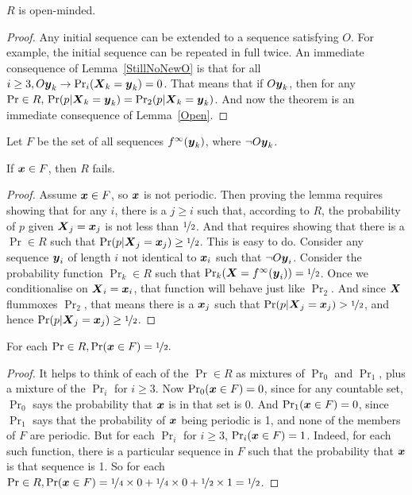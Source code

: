 \begin{theorem}
\label{ROpen}
$R$ is open-minded.
\end{theorem}
\begin{proof}
Any initial sequence can be extended to a sequence satisfying $O$. For example, the initial sequence can be repeated in full twice. An immediate consequence of Lemma~\ref{StillNoNewO} is that for all $i \geq 3,  O\boldsymbol{y}_k \rightarrow \Pr_i(\boldsymbol{X}_k = \boldsymbol{y}_k) = 0$. That means that if $O\boldsymbol{y}_k$, then for any $\Pr \in R,{ } \Pr(p | \boldsymbol{X}_k = \boldsymbol{y}_k) = \Pr_2(p | \boldsymbol{X}_k = \boldsymbol{y}_k)$. And now the theorem is an immediate consequence of Lemma~\ref{Open}.
\end{proof}

Let $F$ be the set of all sequences $f^\infty(\boldsymbol{y}_k)$, where $\neg O \boldsymbol{y}_k$.

\begin{lemma}
\label{FFail}
If $\boldsymbol{x} \in F$, then $R$ fails.
\end{lemma}
\begin{proof}
Assume $\boldsymbol{x} \in F$, so $\boldsymbol{x}$ is not periodic. Then proving the lemma requires showing that for any $i$, there is a $j \geq i$ such that, according to $R$, the probability of $p$ given $\boldsymbol{X}_j =\boldsymbol{x}_j$ is not less than $\nicefrac{1}{2}$. And that requires showing that there is a $\Pr \in R$ such that $\Pr(p | \boldsymbol{X}_j = \boldsymbol{x}_j) \geq \nicefrac{1}{2}$. This is easy to do. Consider any sequence $\boldsymbol{y}_i$ of length $i$ not identical to $\boldsymbol{x}_i$ such that $\neg O \boldsymbol{y}_i$. Consider the probability function $\Pr_k \in R$ such that $\Pr_k(\boldsymbol{X} = f^\infty(\boldsymbol{y}_i)) = \nicefrac{1}{2}$. Once we conditionalise on $\boldsymbol{X}_i = \boldsymbol{x}_i$, that function will behave just like $\Pr_2$. And since $\boldsymbol{X}$ flummoxes $\Pr_2$, that means there is a $\boldsymbol{x}_j$ such that  $\Pr(p | \boldsymbol{X}_j = \boldsymbol{x}_j) > \nicefrac{1}{2}$, and hence $\Pr(p | \boldsymbol{X}_j = \boldsymbol{x}_j) \geq \nicefrac{1}{2}$.
\end{proof}

\begin{lemma}
\label{FHalf}
For each $\Pr \in R, \Pr(\boldsymbol{x} \in F) = \nicefrac{1}{2}.$
\end{lemma}
\begin{proof}
It helps to think of each of the $\Pr \in R$ as  mixtures of $\Pr_0$ and $\Pr_1$, plus a  mixture of the $\Pr_i$ for $i \geq 3$. Now $\Pr_0(\boldsymbol{x} \in F) = 0$, since for any countable set, $\Pr_0$ says the probability that $\boldsymbol{x}$ is in that set is 0. And $\Pr_1(\boldsymbol{x} \in F) = 0$, since $\Pr_1$ says that the probability of $\boldsymbol{x}$ being periodic is 1, and none of the members of $F$ are periodic. But for each $\Pr_i$ for $i \geq 3$, $\Pr_i(\boldsymbol{x} \in F) = 1$. Indeed, for each such function, there is a particular sequence in $F$ such that the probability that $\boldsymbol{x}$ is that sequence is 1. So for each $\Pr \in R, \Pr(\boldsymbol{x} \in F) = \nicefrac{1}{4} \times 0 + \nicefrac{1}{4} \times 0 + \nicefrac{1}{2} \times 1 = \nicefrac{1}{2}$. 
\end{proof}

